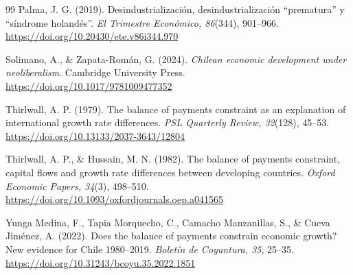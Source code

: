 \documentclass[11pt]{article}
\begin{document}
\begin{thebibliography}{99}
Palma, J. G. (2019). Desindustrialización, desindustrialización ``prematura'' y ``síndrome holandés''. \textit{El Trimestre Económico, 86}(344), 901--966. \url{https://doi.org/10.20430/ete.v86i344.970}

Solimano, A., \& Zapata-Román, G. (2024). \textit{Chilean economic development under neoliberalism}. Cambridge University Press. \url{https://doi.org/10.1017/9781009477352}

Thirlwall, A. P. (1979). The balance of payments constraint as an explanation of international growth rate differences. \textit{PSL Quarterly Review, 32}(128), 45--53. \url{https://doi.org/10.13133/2037-3643/12804}

Thirlwall, A. P., \& Hussain, M. N. (1982). The balance of payments constraint, capital flows and growth rate differences between developing countries. \textit{Oxford Economic Papers, 34}(3), 498--510. \url{https://doi.org/10.1093/oxfordjournals.oep.a041565}

Yunga Medina, F., Tapia Morquecho, C., Camacho Manzanillas, S., \& Cueva Jiménez, A. (2022). Does the balance of payments constrain economic growth? New evidence for Chile 1980--2019. \textit{Boletín de Coyuntura, 35}, 25--35. \url{https://doi.org/10.31243/bcoyu.35.2022.1851}

\end{thebibliography}
\end{document}
